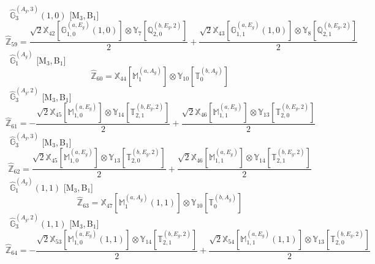 \documentclass[fleqn,10pt,landscape]{article}
\begin{document}
\begin{itemize}
\noindent {} $\,\,\,\hat{\mathbb{G}}_{3}^{(A_{g},3)}(1,0)$ [M$_{3}$,\,B$_{1}$]
\begin{dmath*}
\hat{\mathbb{Z}}_{59}=\frac{\sqrt{2} \mathbb{X}_{42}[\mathbb{G}_{1,0}^{(a,E_{g})}(1,0)] \otimes\mathbb{Y}_{7}[\mathbb{Q}_{2,0}^{(b,E_{g},2)}]}{2} + \frac{\sqrt{2} \mathbb{X}_{43}[\mathbb{G}_{1,1}^{(a,E_{g})}(1,0)] \otimes\mathbb{Y}_{8}[\mathbb{Q}_{2,1}^{(b,E_{g},2)}]}{2}
\end{dmath*}
\vspace{4mm}
\noindent {} $\,\,\,\hat{\mathbb{G}}_{1}^{(A_{g})}$ [M$_{3}$,\,B$_{1}$]
\begin{dmath*}
\hat{\mathbb{Z}}_{60}=\mathbb{X}_{44}[\mathbb{M}_{1}^{(a,A_{g})}] \otimes\mathbb{Y}_{10}[\mathbb{T}_{0}^{(b,A_{g})}]
\end{dmath*}
\vspace{4mm}
\noindent {} $\,\,\,\hat{\mathbb{G}}_{3}^{(A_{g},2)}$ [M$_{3}$,\,B$_{1}$]
\begin{dmath*}
\hat{\mathbb{Z}}_{61}=- \frac{\sqrt{2} \mathbb{X}_{45}[\mathbb{M}_{1,0}^{(a,E_{g})}] \otimes\mathbb{Y}_{14}[\mathbb{T}_{2,1}^{(b,E_{g},2)}]}{2} + \frac{\sqrt{2} \mathbb{X}_{46}[\mathbb{M}_{1,1}^{(a,E_{g})}] \otimes\mathbb{Y}_{13}[\mathbb{T}_{2,0}^{(b,E_{g},2)}]}{2}
\end{dmath*}
\vspace{4mm}
\noindent {} $\,\,\,\hat{\mathbb{G}}_{3}^{(A_{g},3)}$ [M$_{3}$,\,B$_{1}$]
\begin{dmath*}
\hat{\mathbb{Z}}_{62}=\frac{\sqrt{2} \mathbb{X}_{45}[\mathbb{M}_{1,0}^{(a,E_{g})}] \otimes\mathbb{Y}_{13}[\mathbb{T}_{2,0}^{(b,E_{g},2)}]}{2} + \frac{\sqrt{2} \mathbb{X}_{46}[\mathbb{M}_{1,1}^{(a,E_{g})}] \otimes\mathbb{Y}_{14}[\mathbb{T}_{2,1}^{(b,E_{g},2)}]}{2}
\end{dmath*}
\vspace{4mm}
\noindent {} $\,\,\,\hat{\mathbb{G}}_{1}^{(A_{g})}(1,1)$ [M$_{3}$,\,B$_{1}$]
\begin{dmath*}
\hat{\mathbb{Z}}_{63}=\mathbb{X}_{47}[\mathbb{M}_{1}^{(a,A_{g})}(1,1)] \otimes\mathbb{Y}_{10}[\mathbb{T}_{0}^{(b,A_{g})}]
\end{dmath*}
\vspace{4mm}
\noindent {} $\,\,\,\hat{\mathbb{G}}_{3}^{(A_{g},2)}(1,1)$ [M$_{3}$,\,B$_{1}$]
\begin{dmath*}
\hat{\mathbb{Z}}_{64}=- \frac{\sqrt{2} \mathbb{X}_{53}[\mathbb{M}_{1,0}^{(a,E_{g})}(1,1)] \otimes\mathbb{Y}_{14}[\mathbb{T}_{2,1}^{(b,E_{g},2)}]}{2} + \frac{\sqrt{2} \mathbb{X}_{54}[\mathbb{M}_{1,1}^{(a,E_{g})}(1,1)] \otimes\mathbb{Y}_{13}[\mathbb{T}_{2,0}^{(b,E_{g},2)}]}{2}

\end{dmath*}
\end{itemize}
\end{document}
